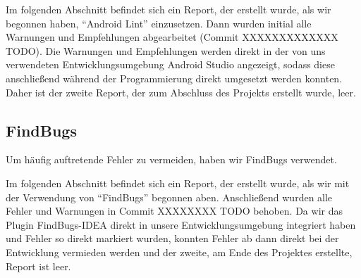 Im folgenden Abschnitt befindet sich ein Report, der erstellt wurde,
als wir begonnen haben, ``Android Lint'' einzusetzen. Dann wurden initial alle
Warnungen und Empfehlungen abgearbeitet (Commit XXXXXXXXXXXXX TODO).
Die Warnungen und Empfehlungen werden direkt in der von uns verwendeten
Entwicklungsumgebung Android Studio angezeigt, sodass diese anschließend während
der Programmierung direkt umgesetzt werden konnten. Daher ist der zweite Report,
der zum Abschluss des Projekts erstellt wurde, leer.






%


\clearpage
\subsection{FindBugs}

Um häufig auftretende Fehler zu vermeiden, haben wir FindBugs verwendet.

Im folgenden Abschnitt befindet sich ein Report, der erstellt wurde, als wir mit der Verwendung von ``FindBugs'' begonnen aben. Anschließend wurden alle Fehler und Warnungen in Commit XXXXXXXX TODO behoben. Da wir das Plugin FindBugs-IDEA direkt in unsere Entwicklungsumgebung integriert haben und Fehler so direkt markiert wurden, konnten Fehler ab dann direkt bei der Entwicklung vermieden werden und der zweite, am Ende des Projektes erstellte, Report ist leer.





